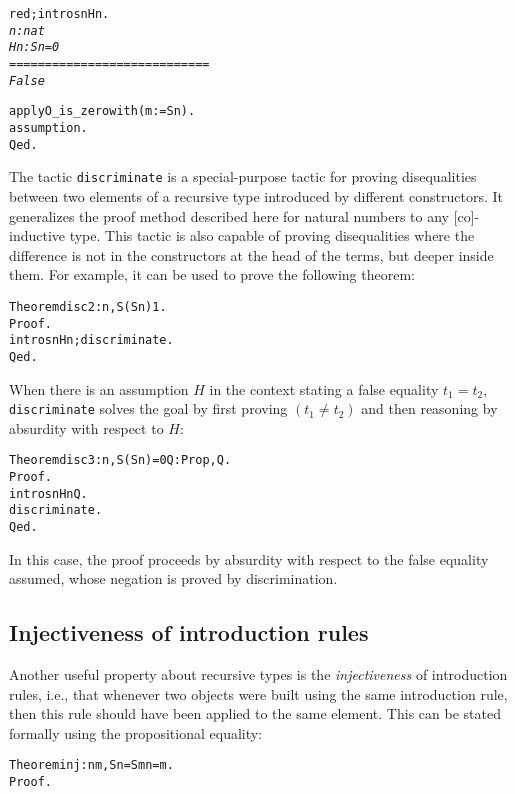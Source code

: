 \documentclass[11pt]{article}
\newcommand{\refmancite}[1]{{}}
\begin{document}
\begin{alltt}

 red; intros n Hn.
 \it{}   
  n : nat
  Hn : S n = 0
  ============================
   False \tt

 apply O_is_zero with (m := S n).
 assumption.
Qed.
\end{alltt}


The tactic \texttt{discriminate} \refmancite{Section \ref{Discriminate}} is
a special-purpose tactic for proving disequalities between two
elements of a recursive type introduced by different constructors. It
generalizes the proof method described here for natural numbers to any
[co]-inductive type. This tactic is also capable of proving disequalities
where the difference is not in the constructors at the head of the
terms, but deeper inside them. For example, it can be used to prove
the following theorem:

\begin{alltt}
Theorem disc2 : {\prodsym} n, S (S n) {\coqdiff} 1. 
Proof.
 intros n Hn; discriminate.
Qed.
\end{alltt}

When there is an assumption $H$ in the context stating a false
equality $t_1=t_2$, \texttt{discriminate} solves the goal by first
proving $(t_1\not =t_2)$ and then reasoning by absurdity with respect
to $H$:

\begin{alltt}
Theorem disc3 : {\prodsym} n, S (S n) = 0 {\arrow} {\prodsym} Q:Prop, Q.
Proof.
 intros n Hn Q.
 discriminate.
Qed.
\end{alltt}

\noindent In this case, the proof proceeds by absurdity with respect
to the false equality assumed, whose negation is proved by
discrimination.

\subsection{Injectiveness of introduction rules}

Another useful property about recursive types is the
\textsl{injectiveness} of introduction rules, i.e., that whenever two
objects were built using the same introduction rule, then this rule
should have been applied to the same element. This can be stated
formally using the propositional equality:

\begin{alltt}
Theorem inj : {\prodsym} n m, S n = S m {\arrow} n = m.
Proof.
\end{alltt}
\end{document}

